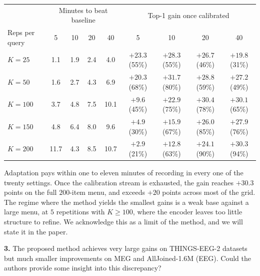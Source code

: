\documentclass[11pt]{article}
\begin{document}
{\begin{center}
\small\setlength{\tabcolsep}{4pt}
\begin{tabular}{lcccc|cccc}
\hline
& \multicolumn{4}{c|}{Minutes to beat baseline} & \multicolumn{4}{c}{Top-1 gain once calibrated} \\
Reps per query & 5 & 10 & 20 & 40 & 5 & 10 & 20 & 40 \\
\hline
$K=25$  & 1.1 & 1.9 & 2.4 & 4.0  & $+23.3$ (55\%) & $+28.3$ (55\%) & $+26.7$ (46\%) & $+19.8$ (31\%) \\
$K=50$  & 1.6 & 2.7 & 4.3 & 6.9  & $+20.3$ (68\%) & $+31.7$ (80\%) & $+28.8$ (59\%) & $+27.2$ (49\%) \\
$K=100$ & 3.7 & 4.8 & 7.5 & 10.1 & $+9.6$ (45\%)  & $+22.9$ (75\%) & $+30.4$ (78\%) & $+30.1$ (65\%) \\
$K=150$ & 4.8 & 6.4 & 8.0 & 9.6  & $+4.9$ (30\%)  & $+15.9$ (67\%) & $+26.0$ (85\%) & $+27.9$ (76\%) \\
$K=200$ & 11.7 & 4.3 & 8.5 & 10.7 & $+2.9$ (21\%) & $+12.8$ (63\%) & $+24.1$ (90\%) & $+30.3$ (94\%) \\
\hline
\end{tabular}
\end{center}

Adaptation pays within one to eleven minutes of recording in every one of the twenty settings. Once the calibration stream is exhausted, the gain reaches $+30.3$ points on the full $200$-item menu, and exceeds $+20$ points across most of the grid. The regime where the method yields the smallest gains is a weak base against a large menu, at $5$ repetitions with $K \geq 100$, where the encoder leaves too little structure to refine. We acknowledge this as a limit of the method, and we will state it in the paper.
}

\textbf{3.} The proposed method achieves very large gains on THINGS-EEG-2 datasets but much smaller
improvements on MEG and AllJoined-1.6M (EEG). Could the authors provide some insight into this
discrepancy?
\end{document}
